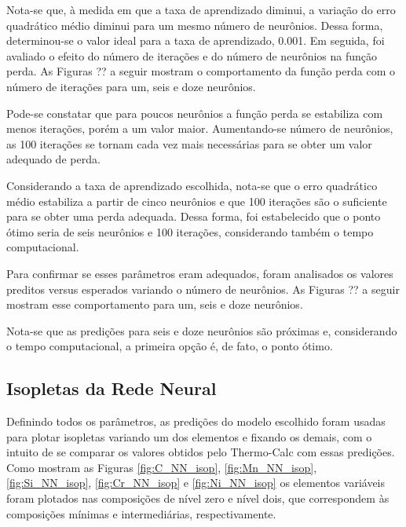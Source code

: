 \documentclass[brazil,tf,epusp]{usp}  %
\begin{document}
Nota-se que, à medida em que a taxa de aprendizado diminui, a variação do erro quadrático médio diminui para um mesmo número de neurônios. Dessa forma, determinou-se o valor ideal para a taxa de aprendizado, 0.001.
Em seguida, foi avaliado o efeito do número de iterações e do número de neurônios na função perda. As Figuras ?? a seguir mostram o comportamento da função perda com o número de iterações para um, seis e doze neurônios.


Pode-se constatar que para poucos neurônios a função perda se estabiliza com menos iterações, porém a um valor maior. Aumentando-se número de neurônios, as 100 iterações se tornam cada vez mais necessárias para se obter um valor adequado de perda.

Considerando a taxa de aprendizado escolhida, nota-se que o erro quadrático médio estabiliza a partir de cinco neurônios e que 100 iterações são o suficiente para se obter uma perda adequada. Dessa forma, foi estabelecido que o ponto ótimo seria de seis neurônios e 100 iterações, considerando também o tempo computacional.

Para confirmar se esses parâmetros eram adequados, foram analisados os valores preditos versus esperados variando o número de neurônios. As Figuras ?? a seguir mostram esse comportamento para um, seis e doze neurônios.

Nota-se que as predições para seis e doze neurônios são próximas e, considerando o tempo computacional, a primeira opção é, de fato, o ponto ótimo.

\subsection{Isopletas da Rede Neural}

Definindo todos os parâmetros, as predições do modelo escolhido foram usadas para plotar isopletas variando um dos elementos e fixando os demais, com o intuito de se comparar os valores obtidos pelo Thermo-Calc\textregistered{} com essas predições. Como mostram as Figuras \ref{fig:C_NN_isop}, \ref{fig:Mn_NN_isop}, \ref{fig:Si_NN_isop}, \ref{fig:Cr_NN_isop} e \ref{fig:Ni_NN_isop} os elementos variáveis foram plotados nas composições de nível zero e nível dois, que correspondem às composições mínimas e intermediárias, respectivamente.
\end{document}
